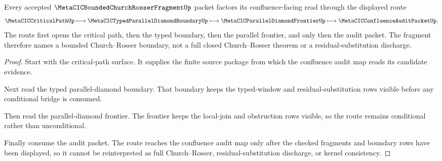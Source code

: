 \begin{theorem}
\label{thm:metacic-bounded-church-rosser-fragment-conditional-route}
Every accepted $\MetaCICBoundedChurchRosserFragmentUp$ packet factors its confluence-facing read through the displayed route
$$
\MetaCICCriticalPathUp \longmapsto \MetaCICTypedParallelDiamondBoundaryUp \longmapsto \MetaCICParallelDiamondFrontierUp \longmapsto \MetaCICConfluenceAuditPacketUp .
$$
The route first opens the critical path, then the typed boundary, then the parallel frontier, and only then the audit packet. The fragment therefore names a bounded Church--Rosser boundary, not a full closed Church--Rosser theorem or a residual-substitution discharge.
\end{theorem}
\begin{proof}
Start with the critical-path surface. It supplies the finite source package from which the confluence audit map reads its candidate evidence.

Next read the typed parallel-diamond boundary. That boundary keeps the typed-window and residual-substitution rows visible before any conditional bridge is consumed.

Then read the parallel-diamond frontier. The frontier keeps the local-join and obstruction rows visible, so the route remains conditional rather than unconditional.

Finally consume the audit packet. The route reaches the confluence audit map only after the checked fragments and boundary rows have been displayed, so it cannot be reinterpreted as full Church--Rosser, residual-substitution discharge, or kernel consistency.
\end{proof}

